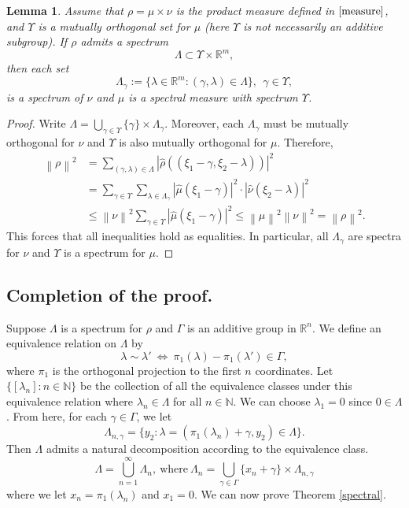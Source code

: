 \documentclass[reqno,a4paper,12pt]{amsart}
\numberwithin{equation}{section}
\newcommand{\R}{{\mathbb R}}
\newcommand{\N}{{\mathbb N}}
\newcommand{\Norm}[1]{{\left\|{#1}\right\|}}
\newcounter{rem}
\newtheorem{lemma}[theorem]{Lemma}
\theoremstyle{remark}
\numberwithin{equation}{section}
\def\N{\mathbb{N}}
\def\R{\mathbb{R}}
\def\blue{\blue}
\def\blue#1{\textcolor[rgb]{0.00,0.00,1.00}{#1}}
\begin{document}
\begin{lemma}\label{spectrum}
Assume that $\rho=\mu\times\nu$ is the product measure defined in $\eqref{measure}$, and $\Upsilon$ is a mutually orthogonal set for $\mu$ (here $\Upsilon$ is not necessarily an additive subgroup). %
If $\rho$ admits a spectrum 
$$
\Lambda\subset \Upsilon\times \mathbb{R}^{m},
$$ then each set
\[
\Lambda_{\gamma}:=\{\lambda\in\mathbb{R}^{m}:(\gamma,\lambda)\in \Lambda\}, ~~\gamma\in \Upsilon,
\]
is a spectrum of $\nu$ and $\mu$ is a spectral measure with spectrum $\Upsilon$. 
\end{lemma}
\begin{proof}
 Write $\Lambda = \bigcup_{\gamma\in\Upsilon}\{\gamma\}\times \Lambda_{\gamma}$. %
 Moreover, each $\Lambda_{\gamma}$ must be mutually orthogonal for $\nu$ and $\Upsilon$ is also mutually orthogonal for $\mu$. Therefore,
    \[
\begin{split}
\Norm{\rho}^2&=\sum_{(\gamma,\lambda)\in \Lambda}|\widehat{\rho}((\xi_1-\gamma,\xi_{2}-\lambda))|^2\nonumber\\
&=\sum_{\gamma\in\Upsilon}\sum_{\lambda\in\Lambda_{\gamma}}|\widehat{\mu}(\xi_1-\gamma)|^2\cdot
|\widehat{\nu}(\xi_{2}-\lambda)|^2\nonumber\\
&\le \Norm{\nu}^2\sum_{\gamma\in\Upsilon}|\widehat{\mu}(\xi_1-\gamma)|^2\le \Norm{\mu}^2\Norm{\nu}^2=\Norm{\rho}^2.
\end{split}
\]
This forces that all inequalities hold as equalities. In particular, all $\Lambda_{\gamma}$ are spectra for $\nu$ and $\Upsilon$ is a spectrum for $\mu$. 
\end{proof}





\subsection{Completion of the proof.} Suppose $\Lambda$ is a spectrum for $\rho$ and $\Gamma$ is an additive group in $\R^n$. We define an equivalence relation on $\Lambda$ by 
$$
\lambda\sim\lambda'~ \Longleftrightarrow ~\pi_1(\lambda)-\pi_1(\lambda')\in \Gamma, 
$$
where $\pi_1$ is the orthogonal projection to the first $n$ coordinates. 
Let $\{[\lambda_n]: n\in\N\}$ be the collection of all the equivalence classes under this equivalence relation where $\lambda_n\in\Lambda$ for all $n\in\N$. We can choose $\lambda_1 = 0$ since $0\in\Lambda$. From here, for each $\gamma\in\Gamma$, we let 
$$
\Lambda_{n,\gamma} = \{y_2: \lambda=(\pi_1(\lambda_n)+\gamma,y_2)\in \Lambda\}.
$$
Then $\Lambda$ admits a natural decomposition according to the equivalence class. 
\begin{equation}\label{eq-equivalence class}
\Lambda = \bigcup_{n=1}^{\infty}\Lambda_n, \ \mbox{where}~ \Lambda_n =  \bigcup_{\gamma\in\Gamma} \{x_n+\gamma\}\times \Lambda_{n,\gamma}
\end{equation}
where we let $x_n = \pi_1(\lambda_n)$ and $x_1 = 0$. We can now  prove Theorem \ref{spectral}.
\smallskip
\end{document}
